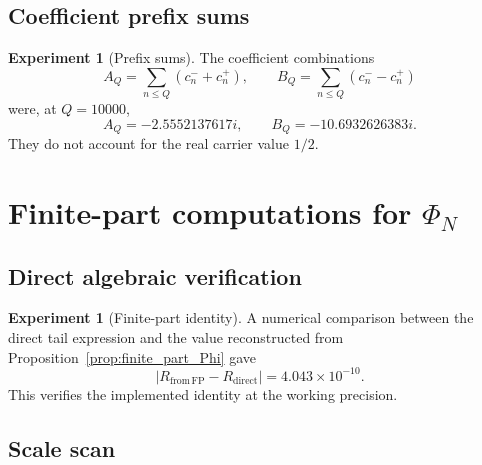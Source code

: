 \documentclass[11pt]{amsart}
\numberwithin{equation}{section}
\theoremstyle{plain}
\theoremstyle{definition}
\newtheorem{experiment}[theorem]{Experiment}
\theoremstyle{remark}
\newcommand{\1}{\mathbf{1}}
\begin{document}
\subsection{Coefficient prefix sums}
\label{subsec:numerical_coefficient_prefixes}

\begin{experiment}[Prefix sums]
\label{exp:numerical_prefix_sums}
The coefficient combinations
\begin{equation}
A_Q=\sum_{n\leq Q}(c_n^-+c_n^+),
\qquad
B_Q=\sum_{n\leq Q}(c_n^--c_n^+)
\label{eq:numerical_AQ_BQ}
\end{equation}
were, at $Q=10000$,
\begin{equation}
A_Q=-2.5552137617i,
\qquad
B_Q=-10.6932626383i.
\label{eq:numerical_AQ_BQ_values_detailed}
\end{equation}
They do not account for the real carrier value $1/2$.
\end{experiment}

\section{Finite-part computations for \texorpdfstring{\(\Phi_N\)}{Phi N}}
\label{sec:numerical_finite_parts}

\subsection{Direct algebraic verification}
\label{subsec:numerical_finite_part_verification}

\begin{experiment}[Finite-part identity]
\label{exp:numerical_finite_part_identity}
A numerical comparison between the direct tail expression and the value
reconstructed from Proposition~\ref{prop:finite_part_Phi} gave
\begin{equation}
|R_{\mathrm{from\,FP}}-R_{\mathrm{direct}}|
=4.043\times10^{-10}.
\label{eq:numerical_finite_part_error_detailed}
\end{equation}
This verifies the implemented identity at the working precision.
\end{experiment}

\subsection{Scale scan}
\label{subsec:numerical_finite_part_scale_scan}
\end{document}
